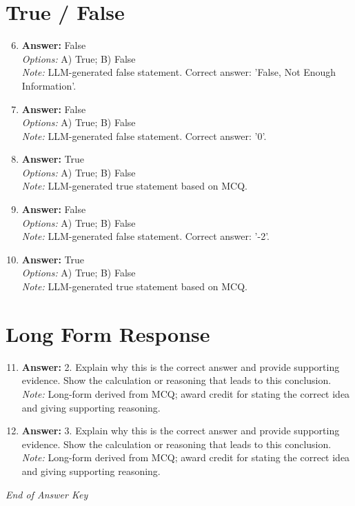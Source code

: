 \documentclass[12pt]{article}
\begin{document}
\section*{True / False}
\begin{enumerate}[label=\arabic*.]
\setcounter{enumi}{5}
\item \textbf{Answer:} False
\\ \textit{Options:} A) True; B) False
\\ \textit{Note:} LLM-generated false statement. Correct answer: 'False, Not Enough Information'.
\item \textbf{Answer:} False
\\ \textit{Options:} A) True; B) False
\\ \textit{Note:} LLM-generated false statement. Correct answer: '0'.
\item \textbf{Answer:} True
\\ \textit{Options:} A) True; B) False
\\ \textit{Note:} LLM-generated true statement based on MCQ.
\item \textbf{Answer:} False
\\ \textit{Options:} A) True; B) False
\\ \textit{Note:} LLM-generated false statement. Correct answer: '-2'.
\item \textbf{Answer:} True
\\ \textit{Options:} A) True; B) False
\\ \textit{Note:} LLM-generated true statement based on MCQ.
\end{enumerate}

\section*{Long Form Response}
\begin{enumerate}[label=\arabic*.]
\setcounter{enumi}{10}
\item \textbf{Answer:} 2. Explain why this is the correct answer and provide supporting evidence. Show the calculation or reasoning that leads to this conclusion.
\\ \textit{Note:} Long-form derived from MCQ; award credit for stating the correct idea and giving supporting reasoning.
\item \textbf{Answer:} 3. Explain why this is the correct answer and provide supporting evidence. Show the calculation or reasoning that leads to this conclusion.
\\ \textit{Note:} Long-form derived from MCQ; award credit for stating the correct idea and giving supporting reasoning.
\end{enumerate}

\vfill
\noindent\textit{End of Answer Key}
\end{document}
